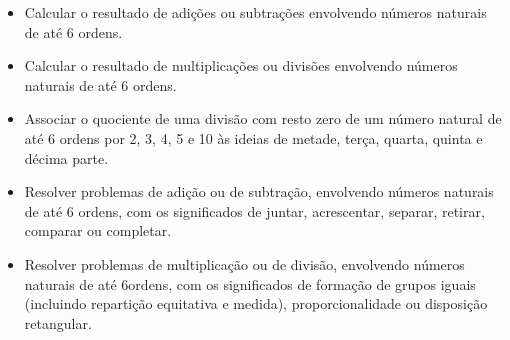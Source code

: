 
\begin{itemize}
\item Calcular o resultado de adições ou subtrações envolvendo números
naturais de até 6 ordens.

\item Calcular o resultado de multiplicações ou divisões envolvendo números
naturais de até 6 ordens.

\item Associar o quociente de uma divisão com resto zero de um número
natural de até 6 ordens por 2, 3, 4, 5 e 10 às ideias de metade, terça,
quarta, quinta e décima parte.

\item Resolver problemas de adição ou de subtração, envolvendo números
naturais de até 6 ordens, com os significados de juntar, acrescentar,
separar, retirar, comparar ou completar.

\item Resolver problemas de multiplicação ou de divisão, envolvendo números
naturais de até 6ordens, com os significados de formação de grupos
iguais (incluindo repartição equitativa e medida), proporcionalidade ou
disposição retangular.
\end{itemize}



